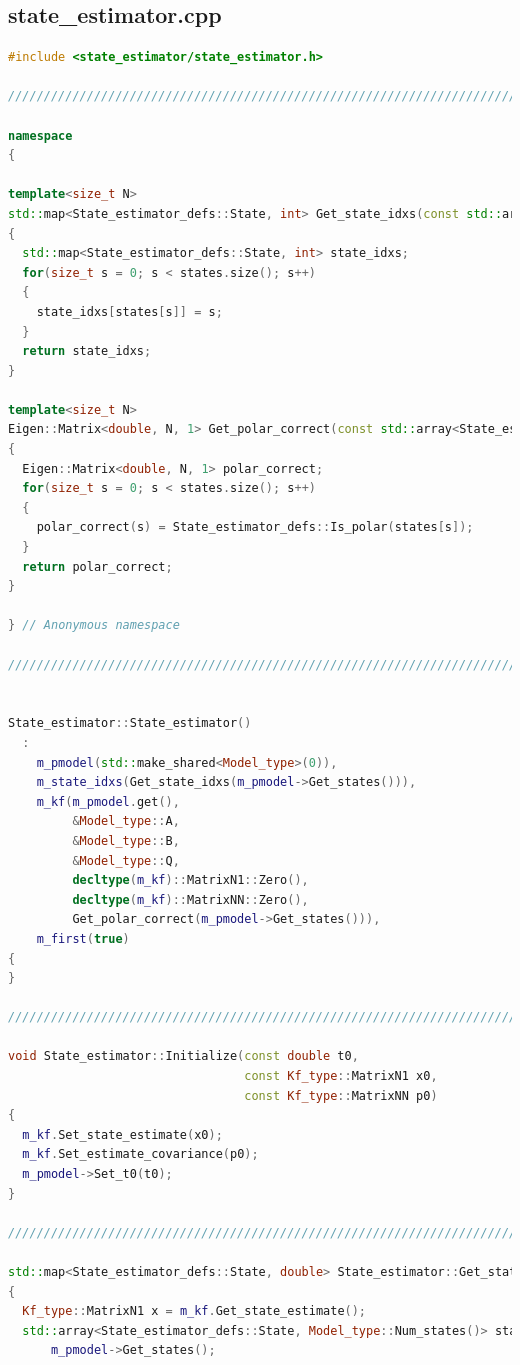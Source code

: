 \documentclass[applsci,article,submit,pdftex,moreauthors]{Definitions/mdpi}
\begin{document}
\subsection{state\_estimator.cpp}
\begin{lstlisting}[language=c++]
#include <state_estimator/state_estimator.h>

///////////////////////////////////////////////////////////////////////

namespace
{

template<size_t N>
std::map<State_estimator_defs::State, int> Get_state_idxs(const std::array<State_estimator_defs::State, N> states)
{
  std::map<State_estimator_defs::State, int> state_idxs;
  for(size_t s = 0; s < states.size(); s++)
  {
    state_idxs[states[s]] = s;
  }
  return state_idxs;
}

template<size_t N>
Eigen::Matrix<double, N, 1> Get_polar_correct(const std::array<State_estimator_defs::State, N> states)
{
  Eigen::Matrix<double, N, 1> polar_correct;
  for(size_t s = 0; s < states.size(); s++)
  {
    polar_correct(s) = State_estimator_defs::Is_polar(states[s]);
  }
  return polar_correct;
}

} // Anonymous namespace

///////////////////////////////////////////////////////////////////////


State_estimator::State_estimator()
  :
    m_pmodel(std::make_shared<Model_type>(0)),
    m_state_idxs(Get_state_idxs(m_pmodel->Get_states())),
    m_kf(m_pmodel.get(),
         &Model_type::A,
         &Model_type::B,
         &Model_type::Q,
         decltype(m_kf)::MatrixN1::Zero(),
         decltype(m_kf)::MatrixNN::Zero(),
         Get_polar_correct(m_pmodel->Get_states())),
    m_first(true)
{
}

///////////////////////////////////////////////////////////////////////

void State_estimator::Initialize(const double t0,
                                 const Kf_type::MatrixN1 x0,
                                 const Kf_type::MatrixNN p0)
{
  m_kf.Set_state_estimate(x0);
  m_kf.Set_estimate_covariance(p0);
  m_pmodel->Set_t0(t0);
}

///////////////////////////////////////////////////////////////////////

std::map<State_estimator_defs::State, double> State_estimator::Get_state_estimates() const
{
  Kf_type::MatrixN1 x = m_kf.Get_state_estimate();
  std::array<State_estimator_defs::State, Model_type::Num_states()> states =
      m_pmodel->Get_states();


\end{lstlisting}
\end{document}
